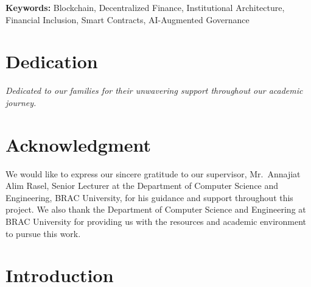 \documentclass[12pt,a4paper]{report}
\begin{document}
\vspace{0.5em}
\noindent\textbf{Keywords:} Blockchain, Decentralized Finance, Institutional Architecture, Financial Inclusion, Smart Contracts, AI-Augmented Governance

\newpage
\thispagestyle{empty}

\chapter*{Dedication}

\vspace{3cm}
\begin{center}
\textit{Dedicated to our families for their unwavering support throughout our academic journey.}
\end{center}

\newpage
\thispagestyle{empty}

\chapter*{Acknowledgment}

We would like to express our sincere gratitude to our supervisor, Mr.\ Annajiat Alim Rasel, Senior Lecturer at the Department of Computer Science and Engineering, BRAC University, for his guidance and support throughout this project. We also thank the Department of Computer Science and Engineering at BRAC University for providing us with the resources and academic environment to pursue this work.

\newpage
\setcounter{page}{1}
\tableofcontents
\newpage
\listoftables
\newpage
\listoffigures
\newpage
{}
\setcounter{page}{1}


\chapter{Introduction}
\end{document}
